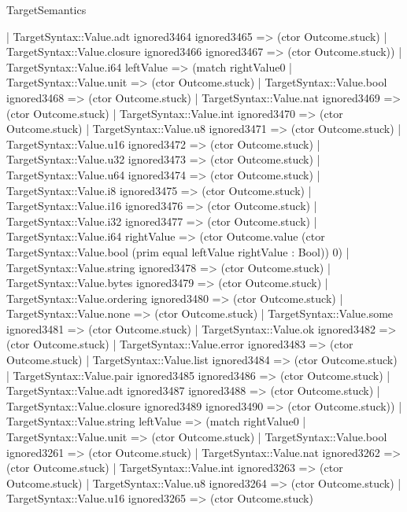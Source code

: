 \begin{lexlean}{TargetSemantics}
\begin{semanticmodule}
{              | TargetSyntax::Value.adt ignored3464 ignored3465 => (ctor Outcome.stuck)
              | TargetSyntax::Value.closure ignored3466 ignored3467 => (ctor Outcome.stuck))
            | TargetSyntax::Value.i64 leftValue => (match rightValue0
              | TargetSyntax::Value.unit => (ctor Outcome.stuck)
              | TargetSyntax::Value.bool ignored3468 => (ctor Outcome.stuck)
              | TargetSyntax::Value.nat ignored3469 => (ctor Outcome.stuck)
              | TargetSyntax::Value.int ignored3470 => (ctor Outcome.stuck)
              | TargetSyntax::Value.u8 ignored3471 => (ctor Outcome.stuck)
              | TargetSyntax::Value.u16 ignored3472 => (ctor Outcome.stuck)
              | TargetSyntax::Value.u32 ignored3473 => (ctor Outcome.stuck)
              | TargetSyntax::Value.u64 ignored3474 => (ctor Outcome.stuck)
              | TargetSyntax::Value.i8 ignored3475 => (ctor Outcome.stuck)
              | TargetSyntax::Value.i16 ignored3476 => (ctor Outcome.stuck)
              | TargetSyntax::Value.i32 ignored3477 => (ctor Outcome.stuck)
              | TargetSyntax::Value.i64 rightValue => (ctor Outcome.value (ctor TargetSyntax::Value.bool (prim equal leftValue rightValue : Bool)) 0)
              | TargetSyntax::Value.string ignored3478 => (ctor Outcome.stuck)
              | TargetSyntax::Value.bytes ignored3479 => (ctor Outcome.stuck)
              | TargetSyntax::Value.ordering ignored3480 => (ctor Outcome.stuck)
              | TargetSyntax::Value.none => (ctor Outcome.stuck)
              | TargetSyntax::Value.some ignored3481 => (ctor Outcome.stuck)
              | TargetSyntax::Value.ok ignored3482 => (ctor Outcome.stuck)
              | TargetSyntax::Value.error ignored3483 => (ctor Outcome.stuck)
              | TargetSyntax::Value.list ignored3484 => (ctor Outcome.stuck)
              | TargetSyntax::Value.pair ignored3485 ignored3486 => (ctor Outcome.stuck)
              | TargetSyntax::Value.adt ignored3487 ignored3488 => (ctor Outcome.stuck)
              | TargetSyntax::Value.closure ignored3489 ignored3490 => (ctor Outcome.stuck))
            | TargetSyntax::Value.string leftValue => (match rightValue0
              | TargetSyntax::Value.unit => (ctor Outcome.stuck)
              | TargetSyntax::Value.bool ignored3261 => (ctor Outcome.stuck)
              | TargetSyntax::Value.nat ignored3262 => (ctor Outcome.stuck)
              | TargetSyntax::Value.int ignored3263 => (ctor Outcome.stuck)
              | TargetSyntax::Value.u8 ignored3264 => (ctor Outcome.stuck)
              | TargetSyntax::Value.u16 ignored3265 => (ctor Outcome.stuck)
}
\end{semanticmodule}
\end{lexlean}
